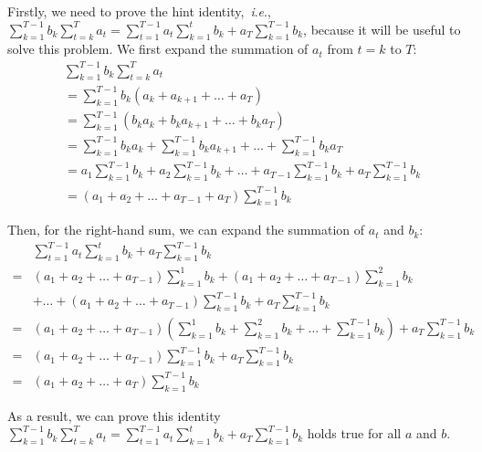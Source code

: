 \documentclass[letterpaper]{article}
\newcommand{\ie}{\emph{i}.\emph{e}.}
\begin{document}
\begin{enumerate}
    Firstly, we need to prove the hint identity,~\ie, $\sum_{k=1}^{T-1} b_k \sum_{t=k}^T a_t = \sum_{t=1}^{T-1}a_t \sum_{k=1}^t b_k + a_T \sum_{k=1}^{T-1}b_k$, because it will be useful to solve this problem. We first expand the summation of $a_t$ from $t=k$ to $T$:
    \begin{equation}
		\begin{aligned}
    		&\sum_{k=1}^{T-1} b_k \sum_{t=k}^T a_t\\
    		&=\sum_{k=1}^{T-1} b_k \left(a_k + a_{k+1} + \ldots + a_T\right)\\
    		&=\sum_{k=1}^{T-1} \left(b_k a_k + b_k a_{k+1} + \ldots + b_k a_T\right)\\
    		&=\sum_{k=1}^{T-1} b_k a_k + \sum_{k=1}^{T-1} b_k a_{k+1} + \ldots + \sum_{k=1}^{T-1} b_k a_T\\
    		&=a_1\sum_{k=1}^{T-1} b_k + a_2\sum_{k=1}^{T-1} b_k + \ldots + a_{T-1}\sum_{k=1}^{T-1} b_k + a_T\sum_{k=1}^{T-1} b_k\\
    		&=\left(a_1 + a_2 + \ldots + a_{T-1} + a_T\right) \sum_{k=1}^{T-1} b_k
    	\end{aligned}
    	\label{Lhand}
	\end{equation}
    
    Then, for the right-hand sum, we can expand the summation of $a_t$ and $b_k$:
    \begin{equation}
    	\begin{aligned}
   		 &\sum_{t=1}^{T-1} a_t \sum_{k=1}^t b_k + a_T \sum_{k=1}^{T-1} b_k\\
   		 =&(a_1 + a_2 + \ldots + a_{T-1}) \sum_{k=1}^1 b_k + (a_1 + a_2 + \ldots + a_{T-1}) \sum_{k=1}^2 b_k \\
   		 &+ \ldots + (a_1 + a_2 + \ldots + a_{T-1}) \sum_{k=1}^{T-1} b_k + a_T \sum_{k=1}^{T-1} b_k\\
   		 =&(a_1 + a_2 + \ldots + a_{T-1}) \left(\sum_{k=1}^1 b_k + \sum_{k=1}^2 b_k + \ldots + \sum_{k=1}^{T-1} b_k\right) + a_T \sum_{k=1}^{T-1} b_k\\
   		 =&(a_1 + a_2 + \ldots + a_{T-1}) \sum_{k=1}^{T-1} b_k + a_T \sum_{k=1}^{T-1} b_k\\
   		 =&(a_1 + a_2 + \ldots + a_{T}) \sum_{k=1}^{T-1} b_k
    	\end{aligned}
    	\label{Rhand}
	\end{equation}
    
	As a result, we can prove this identity $\sum_{k=1}^{T-1} b_k \sum_{t=k}^T a_t = \sum_{t=1}^{T-1}a_t \sum_{k=1}^t b_k + a_T \sum_{k=1}^{T-1}b_k$ holds true for all $a$ and $b$.
    

\end{enumerate}
\end{document}
